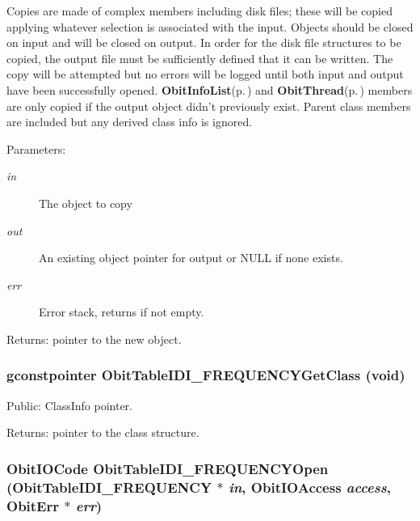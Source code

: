 Copies are made of complex members including disk files; these will be copied applying whatever selection is associated with the input. Objects should be closed on input and will be closed on output. In order for the disk file structures to be copied, the output file must be sufficiently defined that it can be written. The copy will be attempted but no errors will be logged until both input and output have been successfully opened. {\bf Obit\-Info\-List}{\rm (p.\,\pageref{structObitInfoList})} and {\bf Obit\-Thread}{\rm (p.\,\pageref{structObitThread})} members are only copied if the output object didn't previously exist. Parent class members are included but any derived class info is ignored. \begin{Desc}
\item[Parameters:]
\begin{description}
\item[{\em in}]The object to copy \item[{\em out}]An existing object pointer for output or NULL if none exists. \item[{\em err}]Error stack, returns if not empty. \end{description}
\end{Desc}
\begin{Desc}
\item[Returns:]pointer to the new object. \end{Desc}
\subsubsection{\setlength{\rightskip}{0pt plus 5cm}gconstpointer Obit\-Table\-IDI\_\-FREQUENCYGet\-Class (void)}\label{ObitTableIDI__FREQUENCY_8h_a13}


Public: Class\-Info pointer. 

\begin{Desc}
\item[Returns:]pointer to the class structure. \end{Desc}
\subsubsection{\setlength{\rightskip}{0pt plus 5cm}Obit\-IOCode Obit\-Table\-IDI\_\-FREQUENCYOpen ({\bf Obit\-Table\-IDI\_\-FREQUENCY} $\ast$ {\em in}, Obit\-IOAccess {\em access}, {\bf Obit\-Err} $\ast$ {\em err})}\label{ObitTableIDI__FREQUENCY_8h_a17}


